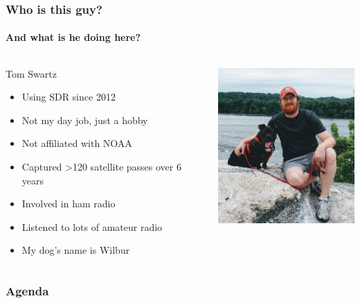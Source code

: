 \documentclass[]{beamer}
\begin{document}
\begin{frame}
    \frametitle{Who is this guy?}
    \framesubtitle{And what is he doing here?}
    \begin{columns}[T]
        \begin{column}[T]{5cm}
           {\huge Tom Swartz}
            \begin{itemize}%
                \item<1->{Using SDR since 2012}
                \item<1->{Not my day job, just a hobby}
                \item<1->{Not affiliated with NOAA}
                \item<1->{Captured \textgreater120 satellite passes over 6 years}
                \item<1->{Involved in ham radio}
                \item<1->{Listened to lots of amateur radio}
                \item<2->{My dog's name is Wilbur}
            \end{itemize}
        \end{column}
        \begin{column}[T]{5cm}
            \includegraphics[height=6cm]{images/me.jpg}
        \end{column}
    \end{columns}
\end{frame}

\begin{frame}
    \frametitle{Agenda}
    \tableofcontents
\end{frame}

\end{document}
